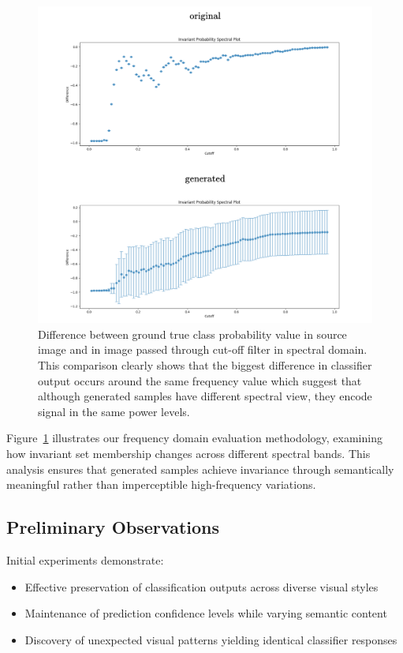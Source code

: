 \documentclass[licencjacka,en]{pracamgr}
\begin{document}
\begin{figure}[h]
\centering
\includegraphics[width=\linewidth]{figures/main/spectral_analysis_2.png}
\caption{Difference between ground true class probability value in source image and in image passed through cut-off filter in spectral domain. This comparison clearly shows that the biggest difference in classifier output occurs around the same frequency value which suggest that although generated samples have different spectral view, they encode signal in the same power levels.}
\label{fig:frequency_analysis_2}
\end{figure}

Figure~\ref{fig:frequency_analysis_2} illustrates our frequency domain evaluation methodology, examining how invariant set membership changes across different spectral bands. This analysis ensures that generated samples achieve invariance through semantically meaningful rather than imperceptible high-frequency variations.

\subsection{Preliminary Observations}

Initial experiments demonstrate:
\begin{itemize}
\item Effective preservation of classification outputs across diverse visual styles
\item Maintenance of prediction confidence levels while varying semantic content  
\item Discovery of unexpected visual patterns yielding identical classifier responses
\end{itemize}
\end{document}

